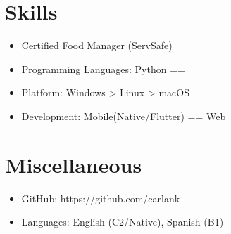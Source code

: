 \documentclass{resume}
\begin{document}

\section{\texorpdfstring{\faCogs}{III)} Skills}
\begin{itemize}[parsep=0.5ex]
  \item Certified Food Manager (ServSafe)
  \item Programming Languages: Python == 
  \item Platform: Windows > Linux > macOS
  \item Development: Mobile(Native/Flutter) == Web
\end{itemize}

\section{\texorpdfstring{\faInfo}{IV)} Miscellaneous}
\begin{itemize}[parsep=0.5ex]
  \item GitHub: https://github.com/carlank
  \item Languages: English (C2/Native), Spanish (B1)
\end{itemize}

%
%
\end{document}
